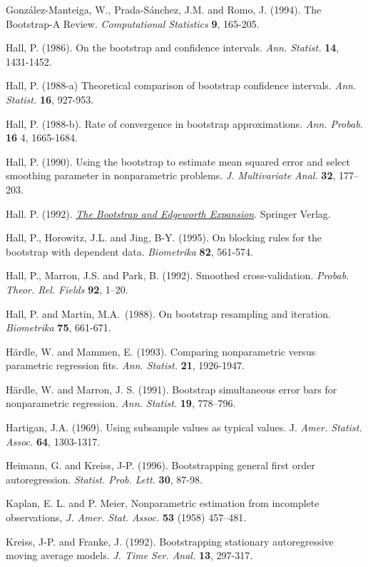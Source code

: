 \documentclass[
]{book}
\theoremstyle{definition}
\theoremstyle{definition}
\theoremstyle{definition}
\theoremstyle{remark}
\begin{document}
González-Manteiga, W., Prada-Sánchez, J.M. and Romo, J. (1994). The
Bootstrap-A Review. \emph{Computational Statistics} \textbf{9}, 165-205.

Hall, P. (1986). On the bootstrap and confidence intervals.
\emph{Ann. Statist.} \textbf{14}, 1431-1452.

Hall, P. (1988-a) Theoretical comparison of bootstrap confidence
intervals. \emph{Ann. Statist.} \textbf{16}, 927-953.

Hall, P. (1988-b). Rate of convergence in bootstrap approximations.
\emph{Ann. Probab.} \textbf{16} 4, 1665-1684.

Hall, P. (1990). Using the bootstrap to estimate mean squared error and
select smoothing parameter in nonparametric problems.
\emph{J. Multivariate Anal.} \textbf{32}, 177--203.

Hall. P. (1992). \href{https://books.google.es/books?hl=es\&lr=\&id=CwLaBwAAQBAJ\&oi=fnd\&pg=PR11\&dq=The+Bootstrap+and+Edgeworth+Expansion}{\emph{The Bootstrap and Edgeworth Expansion}}. Springer Verlag.

Hall, P., Horowitz, J.L. and Jing, B-Y. (1995). On blocking rules for
the bootstrap with dependent data. \emph{Biometrika} \textbf{82}, 561-574.

Hall, P., Marron, J.S. and Park, B. (1992). Smoothed cross-validation.
\emph{Probab. Theor. Rel. Fields} \textbf{92}, 1--20.

Hall, P. and Martin, M.A.~(1988). On bootstrap resampling and iteration.
\emph{Biometrika} \textbf{75}, 661-671.

Härdle, W. and Mammen, E. (1993). Comparing nonparametric versus
parametric regression fits. \emph{Ann. Statist.} \textbf{21}, 1926-1947.

Härdle, W. and Marron, J. S. (1991). Bootstrap simultaneous error bars
for nonparametric regression. \emph{Ann. Statist.} \textbf{19}, 778--796.

Hartigan, J.A. (1969). Using subsample values as typical values. J.
\emph{Amer. Statist. Assoc.} \textbf{64}, 1303-1317.

Heimann, G. and Kreiss, J-P. (1996). Bootstrapping general first order
autoregression. \emph{Statist. Prob. Lett.} \textbf{30}, 87-98.

Kaplan, E. L. and P. Meier, Nonparametric estimation from incomplete
observations, \emph{J. Amer. Stat. Assoc.} \textbf{53} (1958) 457--481.

Kreiss, J-P. and Franke, J. (1992). Bootstrapping stationary
autoregressive moving average models. \emph{J. Time Ser. Anal.} \textbf{13},
297-317.
\end{document}
